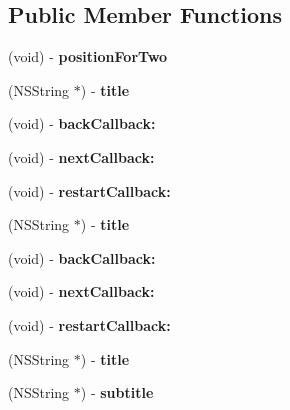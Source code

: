 \subsection*{Public Member Functions}
\begin{DoxyCompactItemize}
\item 
\hypertarget{interface_sprite_demo_add00a4900733a7437d7440ed0339ce77}{(void) -\/ {\bfseries position\-For\-Two}}\label{interface_sprite_demo_add00a4900733a7437d7440ed0339ce77}

\item 
\hypertarget{interface_sprite_demo_a63f8174a22cdaa9990613aa446547401}{(N\-S\-String $\ast$) -\/ {\bfseries title}}\label{interface_sprite_demo_a63f8174a22cdaa9990613aa446547401}

\item 
\hypertarget{interface_sprite_demo_a121d6b10123acefbc18fdce4a2a6ae30}{(void) -\/ {\bfseries back\-Callback\-:}}\label{interface_sprite_demo_a121d6b10123acefbc18fdce4a2a6ae30}

\item 
\hypertarget{interface_sprite_demo_a00a7d77840c476a39a6c63dbfc39c005}{(void) -\/ {\bfseries next\-Callback\-:}}\label{interface_sprite_demo_a00a7d77840c476a39a6c63dbfc39c005}

\item 
\hypertarget{interface_sprite_demo_a63a9e0d4fd964657679b9880a96670e9}{(void) -\/ {\bfseries restart\-Callback\-:}}\label{interface_sprite_demo_a63a9e0d4fd964657679b9880a96670e9}

\item 
\hypertarget{interface_sprite_demo_a76caa91c2e471a1ac2c252781947bd1b}{(N\-S\-String $\ast$) -\/ {\bfseries title}}\label{interface_sprite_demo_a76caa91c2e471a1ac2c252781947bd1b}

\item 
\hypertarget{interface_sprite_demo_a121d6b10123acefbc18fdce4a2a6ae30}{(void) -\/ {\bfseries back\-Callback\-:}}\label{interface_sprite_demo_a121d6b10123acefbc18fdce4a2a6ae30}

\item 
\hypertarget{interface_sprite_demo_a00a7d77840c476a39a6c63dbfc39c005}{(void) -\/ {\bfseries next\-Callback\-:}}\label{interface_sprite_demo_a00a7d77840c476a39a6c63dbfc39c005}

\item 
\hypertarget{interface_sprite_demo_a63a9e0d4fd964657679b9880a96670e9}{(void) -\/ {\bfseries restart\-Callback\-:}}\label{interface_sprite_demo_a63a9e0d4fd964657679b9880a96670e9}

\item 
\hypertarget{interface_sprite_demo_a76caa91c2e471a1ac2c252781947bd1b}{(N\-S\-String $\ast$) -\/ {\bfseries title}}\label{interface_sprite_demo_a76caa91c2e471a1ac2c252781947bd1b}

\item 
\hypertarget{interface_sprite_demo_a67471af6620dbd1cdcbfb72493c58ad4}{(N\-S\-String $\ast$) -\/ {\bfseries subtitle}}\label{interface_sprite_demo_a67471af6620dbd1cdcbfb72493c58ad4}

\end{DoxyCompactItemize}
